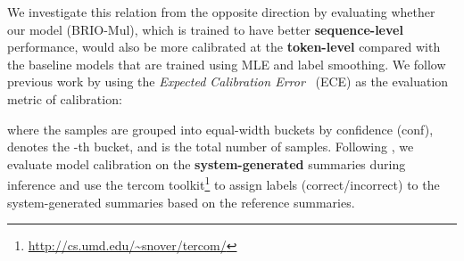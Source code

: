 \documentclass[11pt]{article}
\newcommand{\model}{BRIO\xspace}
\begin{document}
We investigate this relation from the opposite direction by evaluating whether our model (\model-Mul), which is trained to have better \textbf{sequence-level} performance, would also be more calibrated at the \textbf{token-level} compared with the baseline models that are trained using MLE and label smoothing.
We follow previous work by using the \textit{Expected Calibration Error}~\citep{10.5555/2888116.2888120} (ECE) as the evaluation metric of calibration:

where the samples are grouped into  equal-width buckets by confidence (conf),  denotes the -th bucket, and  is the total number of samples.
Following \citet{wang-etal-2020-inference}, we evaluate model calibration on the \textbf{system-generated} summaries during inference and use the tercom toolkit\footnote{\url{http://cs.umd.edu/~snover/tercom/}} 
to assign labels (correct/incorrect) to the system-generated summaries based on the reference summaries.
\end{document}
